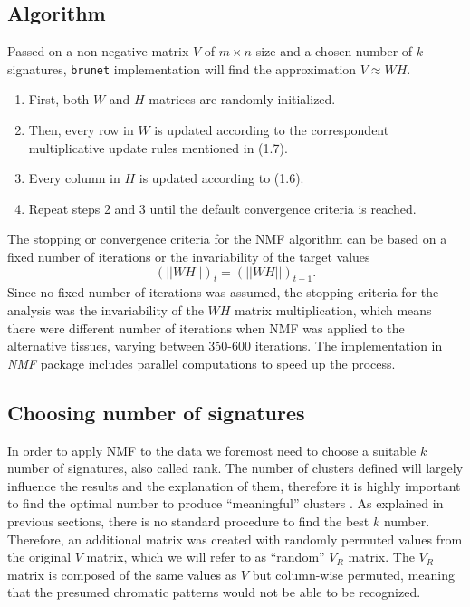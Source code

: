\subsection{Algorithm}

Passed on a non-negative matrix \(V\) of \(m \times n\) size and a chosen number of \(k\) signatures, \texttt{brunet} implementation will find the approximation \(V \approx WH\).

\begin{enumerate}
    \item First, both \(W\) and \(H\) matrices are randomly initialized.
    \item Then, every row in \(W\) is updated according to the correspondent multiplicative update rules mentioned in (1.7).
    \item Every column in \(H\) is updated according to (1.6).
    \item Repeat steps 2 and 3 until the default convergence criteria is reached.
\end{enumerate}

The stopping or convergence criteria for the NMF algorithm can be based on a fixed number of iterations or the invariability of the target values \[( \vert \vert WH \vert \vert  )_t = ( \vert \vert WH \vert \vert  )_{t+1}.\] Since no fixed number of iterations was assumed, the stopping criteria for the analysis was the invariability of the \(WH\) matrix multiplication, which means there were different number of iterations when NMF was applied to the alternative tissues, varying between 350-600 iterations. The implementation in \textit{NMF} package includes parallel computations to speed up the process.


\subsection{Choosing number of signatures}\label{chooseK}

In order to apply NMF to the data we foremost need to choose a suitable \(k\) number of signatures, also called rank. The number of clusters defined will largely influence the results and the explanation of them, therefore it is highly important to find the optimal number to produce ``meaningful'' clusters \cite{Brunet2004}. As explained in previous sections, there is no standard procedure to find the best \(k\) number. Therefore, an additional matrix was created with randomly permuted values from the original \(V\) matrix, which we will refer to as ``random'' \(V_R\) matrix. The \(V_R\) matrix is composed of the same values as \(V\) but column-wise permuted, meaning that the presumed chromatic patterns would not be able to be recognized.

